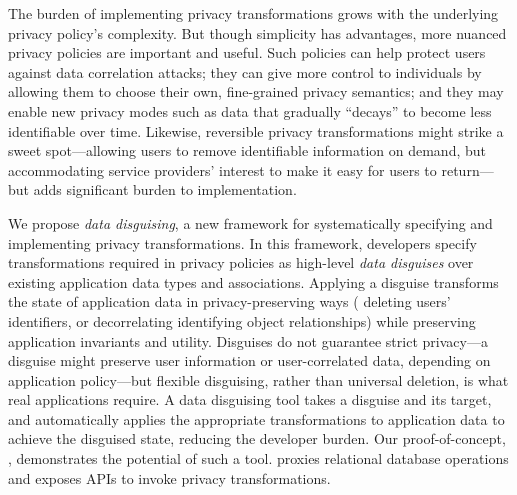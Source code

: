 %
The burden of implementing privacy transformations grows with the underlying privacy policy's
complexity.
%
But though simplicity has advantages, more nuanced privacy policies are important and useful.
%
Such policies can help protect users against data correlation attacks; they can give more
control to individuals by allowing them to choose their own, fine-grained privacy semantics; and
they may enable new privacy modes such as data that gradually ``decays'' to become less identifiable over time.
%
Likewise, reversible privacy transformations might strike a sweet
spot---allowing users to remove identifiable information on demand,
but accommodating service providers' interest to make it easy for users to return---but
adds significant burden to implementation.


%
%
%
%
We propose \emph{data disguising}, a new framework
for systematically specifying and implementing privacy transformations.
%
In this framework, developers specify transformations required in privacy policies as
high-level \emph{data disguises} over existing application data types and associations.
%
Applying a disguise transforms the state of application data in privacy-preserving ways (\eg
deleting users' identifiers, or decorrelating identifying object relationships) while preserving
application invariants and utility.
%
Disguises do not guarantee strict privacy---a disguise might preserve user information
or user-correlated data, depending on application policy---but flexible disguising,
rather than universal deletion, is what real applications require.
%
%
A data disguising tool takes a disguise and its target, and automatically applies the appropriate
transformations to application data to achieve the disguised state, reducing the developer burden.
%
Our proof-of-concept, \sys, demonstrates the potential of such a tool.
%
\sys proxies relational database operations and exposes APIs to invoke privacy transformations.
%

